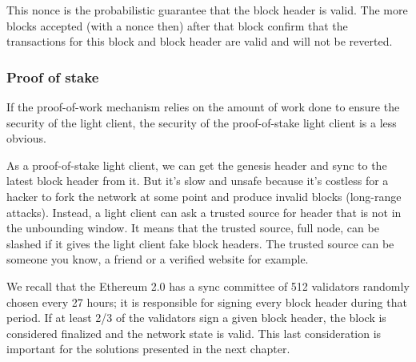 This nonce is the probabilistic guarantee that the block header is valid. The more blocks accepted (with a nonce then) after that block confirm that the transactions for this block and block header are valid and will not be reverted.

\subsubsection{Proof of stake}
\label{securitylc:pos}
If the proof-of-work mechanism relies on the amount of work done to ensure the security of the light client, the security of the proof-of-stake light client is a less obvious. 

As a proof-of-stake light client, we can get the genesis header and sync to the latest block header from it. But it's slow and unsafe because it's costless for a hacker to fork the network at some point and produce invalid blocks (long-range attacks). 
Instead, a light client can ask a trusted source for header that is not in the unbounding window. It means that the trusted source, full node, can be slashed if it gives the light client fake block headers. The trusted source can be someone you know, a friend or a verified website for example.

We recall that the Ethereum 2.0 has a sync committee of 512 validators randomly chosen every 27 hours; it is responsible for signing every block header during that period. If at least 2/3 of the validators sign a given block header, the block is considered finalized and the network state is valid. 
This last consideration is important for the solutions presented in the next chapter.
